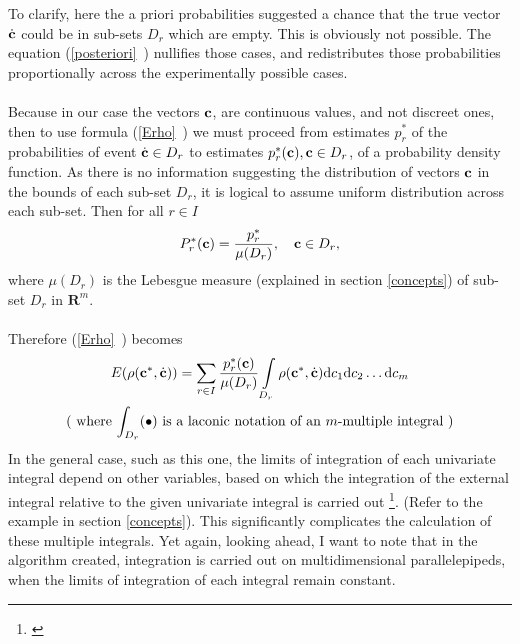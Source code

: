 To clarify, here the a priori probabilities suggested a chance that the true vector $\dot{\textbf{c}}$ could be in sub-sets $D_{r}$ which are empty. This is obviously not possible. The equation (\vref{posteriori}~) nullifies those cases, and redistributes those probabilities proportionally across the experimentally possible cases.\\
\\
Because in our case the vectors $\textbf{c}$, are continuous values, and not discreet ones, then to use formula (\vref{Erho}~) we must proceed from estimates $p_{r}^{*}$ of the probabilities of event $\dot{\textbf{c}} \in D_{r}$ to estimates $p_{r}^{*}(\textbf{c}), \textbf{c} \in D_{r}$, of a probability density function. As there is no information suggesting the distribution of vectors $\textbf{c}$ in the bounds of each sub-set $D_{r}$, it is logical to assume uniform distribution across each sub-set. Then for all $r \in I$
\begin{equation}
P_{r}^{*}(\textbf{c})=\frac{p_{r}^{*}}{\mu(D_{r})}, \quad \textbf{c} \in D_{r},
\end{equation}
where $\mu(D_{r})$ is the Lebesgue measure (explained in section \vref{concepts}) of sub-set $D_{r}$ in $\boldsymbol{R}^{m}$. \\
\\
Therefore (\vref{Erho}~) becomes
\begin{gather}
E(\rho(\textbf{c}^{*},\dot{\textbf{c}}))=\sum\limits_{r \in I} \frac{p_{r}^{*}(\textbf{c})}{\mu(D_{r})} \int\limits_{D_{r}}\rho(\textbf{c}^{*},\dot{\textbf{c}})\mathrm{d}c_{1}\mathrm{d}c_{2}\dots \mathrm{d}c_{m} \label{mathexpectancy}\\
\nonumber
\text{( where $\int_ {D_{r}}(\bullet)$ is a laconic notation of an $m$-multiple integral )}
\end{gather}
In the general case, such as this one, the limits of integration of each univariate integral depend on other variables, based on which the integration of the external integral relative to the given univariate integral is carried out \footnote{\cite{stewart_2008_int}}. (Refer to the example in section \vref{concepts}). This significantly complicates the calculation of these multiple integrals. Yet again, looking ahead, I want to note that in the algorithm created, integration is carried out on multidimensional parallelepipeds, when the limits of integration of each integral remain constant.

